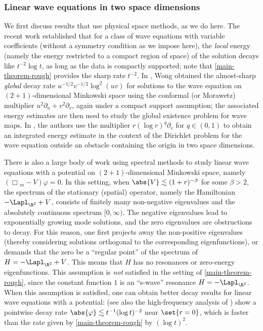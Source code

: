 \documentclass[10pt, reqno]{amsart}
\begin{document}
\subsubsection{Linear wave equations in two space dimensions}
\label{intro-2d}
We first discuss results that use physical space methods, as we do here. The recent work
\cite{ikehata2025localenergydecay2d} established that for a class of wave
equations with variable coefficients (without a symmetry condition as we impose
here), the \emph{local} energy (namely the energy restricted to a compact region of
space) of the solution decays like \(t^{-2}\log t\), as long as the data is
compactly supported; note that \cref{main-theorem-rough} provides the sharp rate
\(t^{-2}\). In \cite{wong2019smalldataglobalexistence}, Wong obtained the
almost-sharp \emph{global} decay rate \(u^{-1/2}v^{-1/2}\log ^2(uv)\) for solutions to
the wave equation on \((2 + 1)\)-dimensional Minkowski space using the conformal
(or Morawetz) multiplier \(u^2\partial_u + v^2\partial_v\), again under a
compact support assumption; the associated energy estimates are then used to
study the global existence problem for wave maps. In
\cite{metcalfe-hepditch-obstacle}, the authors use the multiplier \(r(\log
r)^q\partial_v\) for \(q\in (0,1)\) to obtain an integrated energy estimate in
the context of the Dirichlet problem for the wave equation outside an obstacle
containing the origin in two space dimensions.

There is also a large body of work using spectral methods to study linear wave
equations with a potential on \((2 + 1)\)-dimensional Minkowski space, namely
\((\Box{}_{m}-V)\varphi{} = 0\). In this setting, when \(\abs{V}\lesssim (1 +
r)^{-\beta{}}\) for some \(\beta{} > 2\), the spectrum of the stationary
(spatial) operator, namely the Hamiltonian \(-\Lapl _{\R^2}+V\), consists of
finitely many non-negative eigenvalues and the absolutely continuous spectrum
\([0,\infty)\). The negative eigenvalues lead to exponentially growing mode
solutions, and the zero eigenvalues are obstructions to decay. For this reason,
one first projects away the non-positive eigenvalues (thereby considering
solutions orthogonal to the corresponding eigenfunctions), or demands that the
zero be a ``regular point'' of the spectrum of \(H = -\Lapl _{\R^2}+V\). This
means that \(H\) has no resonances or zero-energy eigenfunctions. This
assumption is \emph{not} satisfied in the setting of \cref{main-theorem-rough}, since the
constant function \(1\) is an ``s-wave'' resonance \(H = -\Lapl_{\R^2}\). When
this assumption is satisfied, one can obtain better decay results for linear
wave equations with a potential: \cite{Kopylova2010-dj,Green_2014}
(see also the high-frequency analysis of \cite{Moulin2009-uy}) show a pointwise
decay rate \(\abs{\varphi{}}\lesssim t^{-1}(\log t)^{-2}\) near \(\set{r=0}\),
which is faster than the rate given by \cref{main-theorem-rough} by \((\log t)^2\).
\end{document}
